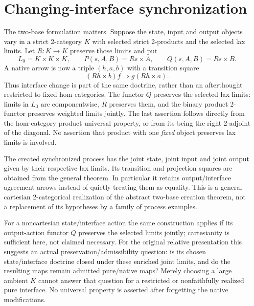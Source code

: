 \documentclass{article}
\begin{document}
\section{Changing-interface synchronization}
The two-base formulation matters. Suppose the state, input and output objects vary in a strict 2-category $K$ with selected strict 2-products and the selected lax limits. Let $R:K\to K$ preserve those limits and put
\[
L_0=K\times K\times K,\qquad
P(s,A,B)=Rs\times A,\qquad Q(s,A,B)=Rs\times B.
\]
A native arrow is now a triple $(h,a,b)$ with a transition square
\[
(Rh\times b)f\Rightarrow g(Rh\times a).
\]
Thus interface change is part of the same doctrine, rather than an afterthought restricted to fixed hom categories. The functor $Q$ preserves the selected lax limits: limits in $L_0$ are componentwise, $R$ preserves them, and the binary product 2-functor preserves weighted limits jointly. The last assertion follows directly from the hom-category product universal property, or from its being the right 2-adjoint of the diagonal. No assertion that product with one \emph{fixed} object preserves lax limits is involved.

The created synchronized process has the joint state, joint input and joint output given by their respective lax limits. Its transition and projection squares are obtained from the general theorem. In particular it retains output/interface agreement arrows instead of quietly treating them as equality. This is a general cartesian 2-categorical realization of the abstract two-base creation theorem, not a replacement of its hypotheses by a family of process examples.

For a noncartesian state/interface action the same construction applies if its output-action functor $Q$ preserves the selected limits jointly; cartesianity is sufficient here, not claimed necessary. For the original relative presentation this suggests an actual preservation/admissibility question: is its chosen state/interface doctrine closed under these enriched joint limits, and do the resulting maps remain admitted pure/native maps? Merely choosing a large ambient $K$ cannot answer that question for a restricted or nonfaithfully realized pure interface. No universal property is asserted after forgetting the native modifications.
\end{document}
